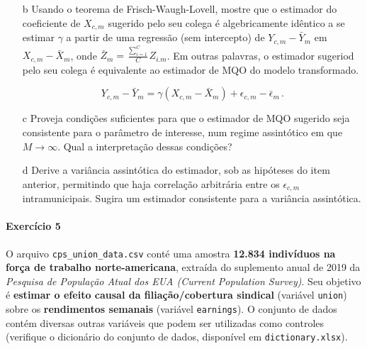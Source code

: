 \documentclass[10pt,a4paper]{article}
\begin{document}
 \begin{itemize}
 	\item[b] Usando o teorema de Frisch-Waugh-Lovell, mostre que o estimador do coeficiente de $X_{c,m}$ sugerido pelo seu colega é algebricamente idêntico a se estimar $\gamma$ a partir de uma regressão (sem intercepto) de $Y_{c,m} - \bar{Y}_m$ em $X_{c,m} - \bar{X}_m$, onde $\bar{Z}_m = \frac{\sum_{i=1}^{C}}{C} Z_{i.m}$. Em outras palavras, o estimador sugeriod pelo seu colega é equivalente ao estimador de MQO do modelo transformado.
 	
 	$$Y_{c,m} - \bar{Y}_m = \gamma (X_{c,m}-\bar{X}_m) + \epsilon_{c,m}-\bar{\epsilon}_m\, .$$
 	
 	\item[c] Proveja condições suficientes para que o estimador de MQO sugerido seja consistente para o parâmetro de interesse, num regime assintótico em que $M \to \infty$. Qual a interpretação dessas condições?
 	
 	\item[d] Derive a variância assintótica do estimador, sob as hipóteses do item anterior, permitindo que haja correlação arbitrária entre os $\epsilon_{c,m}$ intramunicipais. Sugira um estimador consistente para a variância assintótica.
 \end{itemize}
 
 
 \paragraph{Exercício 5} O arquivo \texttt{cps\_union\_data.csv} conté uma amostra \textbf{12.834 indivíduos na força de trabalho norte-americana}, extraída do suplemento anual de 2019 da \textit{Pesquisa de População Atual dos EUA (Current Population Survey)}. Seu objetivo é \textbf{estimar o efeito causal da filiação/cobertura sindical} (variável \texttt{union}) sobre os \textbf{rendimentos semanais} (variável \texttt{earnings}). O conjunto de dados contém diversas outras variáveis que podem ser utilizadas como controles (verifique o dicionário do conjunto de dados, disponível em \texttt{dictionary.xlsx}).
 
\end{document}
